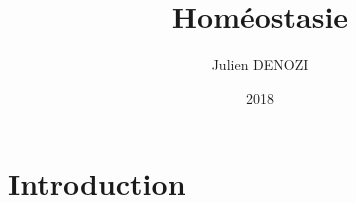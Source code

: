 \documentclass[a4paper]{article}
\title{Homéostasie}
\author{Julien DENOZI}
\date{2018}
\begin{document}
\maketitle

\section{Introduction}



\end{document}
